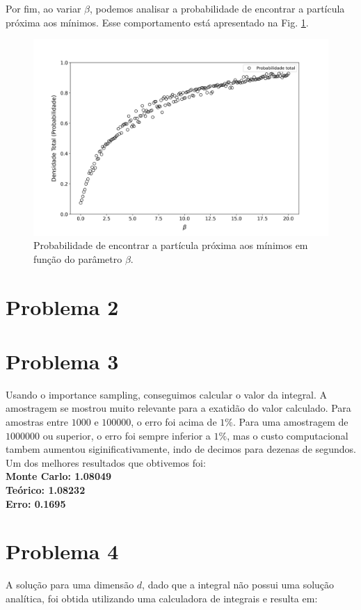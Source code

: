 \documentclass[a4paper, 12pt]{article}
\begin{document}
Por fim, ao variar \(\beta\), podemos analisar a probabilidade de encontrar a partícula próxima aos mínimos. Esse comportamento está apresentado na Fig. \ref{fig:Q2_d}.

\begin{figure}[H]
    \centering
    \includegraphics[scale=0.39]{Q2_d.png}
    \caption{Probabilidade de encontrar a partícula próxima aos mínimos em função do parâmetro \(\beta\).}
    \label{fig:Q2_d}
\end{figure}

\section*{Problema 2}
\section*{Problema 3}
Usando o importance sampling, conseguimos calcular o valor da integral. A amostragem se mostrou 
muito relevante para a exatidão do valor calculado. Para amostras entre \(1000\) e \(100000\), o erro
foi acima de \(1\%\). Para uma amostragem de \(1000000\) ou superior, o erro foi sempre inferior a \(1\%\),
mas o custo computacional tambem aumentou siginificativamente, indo de decimos para dezenas de segundos. 
Um dos melhores resultados que obtivemos foi:
\\

\noindent\textbf{Monte Carlo: 1.08049}\\
\textbf{Teórico: 1.08232}\\
\textbf{Erro: 0.1695}

\section*{Problema 4}
A solução para uma dimensão \(d\), dado que a integral não possui uma solução analítica, foi 
obtida utilizando uma calculadora de integrais e resulta em:
\end{document}

